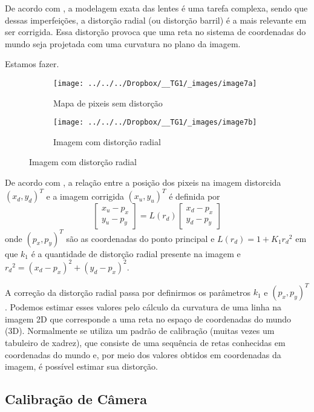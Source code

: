 \documentclass[ecp,tc]{iiufrgs}
\begin{document}
De acordo com , a modelagem exata das lentes é uma tarefa complexa, sendo que dessas imperfeições, a distorção radial (ou distorção barril) é a mais relevante em ser corrigida. Essa distorção provoca que uma reta no sistema de coordenadas do mundo seja projetada com uma curvatura no plano da imagem.

Estamos fazer.


\begin{figure}
	\centering
	\caption{Distorção radial}
	\begin{subfigure}[b]{0.4\textwidth}
		\texttt{[image: ../../../Dropbox/\_\_TG1/\_images/image7a]}
		\caption{Mapa de pixeis sem distorção}
		\label{fig:image7a}
	\end{subfigure}
	\quad
	\begin{subfigure}[b]{0.4\textwidth}
		\texttt{[image: ../../../Dropbox/\_\_TG1/\_images/image7b]}
		\caption{Imagem com distorção radial}
		\label{fig:image7b}
	\end{subfigure}
	\label{fig:image7}
\end{figure}

De acordo com , a relação entre a posição dos pixeis na imagem distorcida $ (x_d, y_d)^T $ e a imagem corrigida $ (x_u, y_u)^T $ é definida por
\[ \begin{bmatrix}x_u - p_x \\ y_u - p_y \end{bmatrix} = L(r_d)\begin{bmatrix}x_d - p_x \\ y_d - p_y \end{bmatrix}\]
onde $ (p_x, p_y)^T $ são as coordenadas do ponto principal e $ L(r_d) = 1+K_1{r_d}^2 $ em que $ k_1 $ é a quantidade de distorção radial presente na imagem e $ {r_d}^2 = (x_d - p_x)^2 + (y_d - p_x)^2 $.

A correção da distorção radial passa por definirmos os parâmetros $ k_1 $ e $ (p_x, p_y)^T $. Podemos estimar esses valores pelo cálculo da curvatura de uma linha na imagem 2D que corresponde a uma reta no espaço de coordenadas do mundo (3D). Normalmente se utiliza um padrão de calibração (muitas vezes um tabuleiro de xadrez), que consiste de uma sequência de retas conhecidas em coordenadas do mundo e, por meio dos valores obtidos em coordenadas da imagem, é possível estimar sua distorção.

\subsection{Calibração de Câmera}
\end{document}
